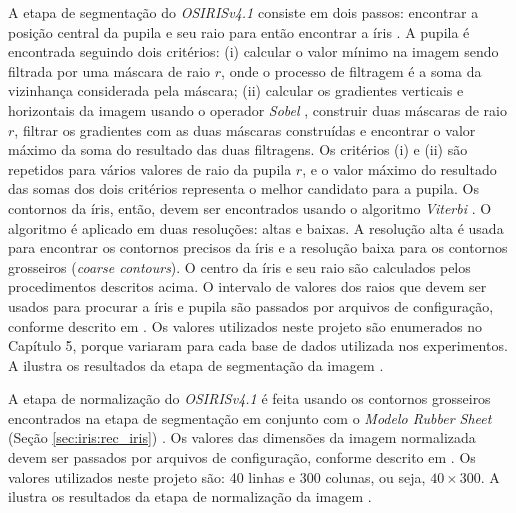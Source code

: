 
\par A etapa de segmentação do \textit{OSIRISv4.1} consiste em dois passos: encontrar a posição central da pupila e seu raio para então encontrar a íris \cite{osirisv41_doc}. A pupila é encontrada seguindo dois critérios: (i) calcular o valor mínimo na imagem sendo filtrada por uma máscara de raio $r$, onde o processo de filtragem é a soma da vizinhança considerada pela máscara; (ii) calcular os gradientes verticais e horizontais da imagem usando o operador \textit{Sobel} \cite{kanopoulos1988}, construir duas máscaras de raio $r$, filtrar os gradientes com as duas máscaras construídas e encontrar o valor máximo da soma do resultado das duas filtragens. Os critérios (i) e (ii)  são repetidos para vários valores de raio da pupila $r$, e o valor máximo do resultado das somas dos dois critérios representa o melhor candidato para a pupila. Os contornos da íris, então, devem ser encontrados usando o algoritmo \textit{Viterbi} \cite{sutra2012}. O algoritmo é aplicado em duas resoluções: altas e baixas. A resolução alta é usada para encontrar os contornos precisos da íris e a resolução baixa para os contornos grosseiros (\textit{coarse contours}). O centro da íris e seu raio são calculados pelos procedimentos descritos acima. O intervalo de valores dos raios que devem ser usados para procurar a íris e pupila são passados por arquivos de configuração, conforme descrito em \cite{osirisv41_doc}. Os valores utilizados neste projeto são enumerados no Capítulo 5, porque variaram para cada base de dados utilizada nos experimentos. A  ilustra os resultados da etapa de segmentação da imagem .


\par A etapa de normalização do \textit{OSIRISv4.1} é feita usando os contornos grosseiros encontrados na etapa de segmentação em conjunto com o \textit{Modelo Rubber Sheet} (Seção \ref{sec:iris:rec_iris}) \cite{osirisv41_doc}. Os valores das dimensões da imagem normalizada devem ser passados por arquivos de configuração, conforme descrito em \cite{osirisv41_doc}. Os valores utilizados neste projeto são: 40 linhas e 300 colunas, ou seja, $40 \times 300$. A  ilustra os resultados da etapa de normalização da imagem .

